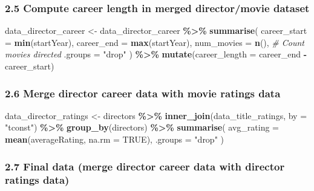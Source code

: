 \documentclass[
]{article}
\newenvironment{Shaded}{\begin{snugshade}}{\end{snugshade}}
\newcommand{\AttributeTok}[1]{\textcolor[rgb]{0.13,0.29,0.53}{#1}}
\newcommand{\CommentTok}[1]{\textcolor[rgb]{0.56,0.35,0.01}{\textit{#1}}}
\newcommand{\ConstantTok}[1]{\textcolor[rgb]{0.56,0.35,0.01}{#1}}
\newcommand{\FunctionTok}[1]{\textcolor[rgb]{0.13,0.29,0.53}{\textbf{#1}}}
\newcommand{\NormalTok}[1]{#1}
\newcommand{\OtherTok}[1]{\textcolor[rgb]{0.56,0.35,0.01}{#1}}
\newcommand{\SpecialCharTok}[1]{\textcolor[rgb]{0.81,0.36,0.00}{\textbf{#1}}}
\newcommand{\StringTok}[1]{\textcolor[rgb]{0.31,0.60,0.02}{#1}}
\begin{document}
\subsubsection{2.5 Compute career length in merged director/movie
dataset}\label{compute-career-length-in-merged-directormovie-dataset}

\begin{Shaded}
\begin{Highlighting}[]
\NormalTok{data\_director\_career }\OtherTok{\textless{}{-}}\NormalTok{ data\_director\_career }\SpecialCharTok{\%\textgreater{}\%} 
\FunctionTok{summarise}\NormalTok{(}
    \AttributeTok{career\_start =} \FunctionTok{min}\NormalTok{(startYear),}
    \AttributeTok{career\_end =} \FunctionTok{max}\NormalTok{(startYear),}
    \AttributeTok{num\_movies =} \FunctionTok{n}\NormalTok{(),  }\CommentTok{\# Count movies directed}
    \AttributeTok{.groups =} \StringTok{"drop"}
\NormalTok{  ) }\SpecialCharTok{\%\textgreater{}\%}
  \FunctionTok{mutate}\NormalTok{(}\AttributeTok{career\_length =}\NormalTok{ career\_end }\SpecialCharTok{{-}}\NormalTok{ career\_start)}
\end{Highlighting}
\end{Shaded}

\subsubsection{2.6 Merge director career data with movie ratings
data}\label{merge-director-career-data-with-movie-ratings-data}

\begin{Shaded}
\begin{Highlighting}[]
\NormalTok{data\_director\_ratings }\OtherTok{\textless{}{-}}\NormalTok{ directors }\SpecialCharTok{\%\textgreater{}\%}
  \FunctionTok{inner\_join}\NormalTok{(data\_title\_ratings, }\AttributeTok{by =} \StringTok{"tconst"}\NormalTok{) }\SpecialCharTok{\%\textgreater{}\%}
  \FunctionTok{group\_by}\NormalTok{(directors) }\SpecialCharTok{\%\textgreater{}\%}
  \FunctionTok{summarise}\NormalTok{(}
    \AttributeTok{avg\_rating =} \FunctionTok{mean}\NormalTok{(averageRating, }\AttributeTok{na.rm =} \ConstantTok{TRUE}\NormalTok{),}
    \AttributeTok{.groups =} \StringTok{"drop"}
\NormalTok{)}
\end{Highlighting}
\end{Shaded}

\subsubsection{2.7 Final data (merge director career data with director
ratings
data)}\label{final-data-merge-director-career-data-with-director-ratings-data}
\end{document}
